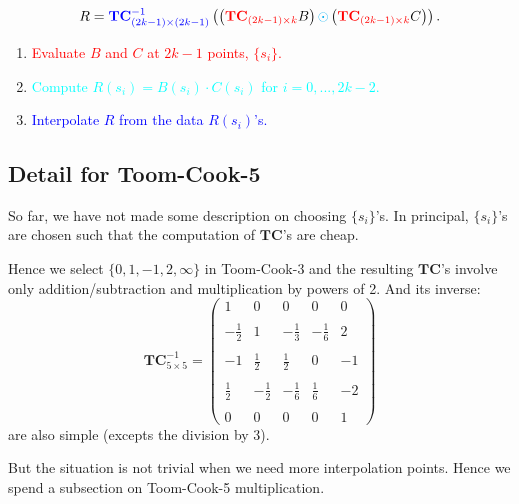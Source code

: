 \documentclass[
11pt,notheorems,hyperref={pdfauthor=whatever}
]{beamer}
\begin{document}
\begin{frame}
    \[
        R =\textcolor{blue}{\mathbf{TC}_{(2k-1) \times (2k-1)}^{-1}}
        \left(
            \left(
                \textcolor{red}{\mathbf{TC}_{(2k-1) \times k}} B
            \right) \textcolor{cyan}{\odot}\left(
                \textcolor{red}{\mathbf{TC}_{(2k-1) \times k}} C
            \right)
        \right) .
    \]
    \begin{enumerate}
        \item \textcolor{red}{Evaluate $B$ and $C$ at $2k-1$ points,  $\{ s_{i} \}$.}
        \item \textcolor{cyan}{Compute $R(s_{i}) = B(s_{i}) \cdot C(s_{i})$ for $i=0,...,2k-2$.}
        \item \textcolor{blue}{Interpolate $R$ from the data $R(s_{i})$'s.}
    \end{enumerate}
\end{frame}

\subsection{Detail for Toom-Cook-5}
\begin{frame}
So far, we have not made some description on choosing $\{s_{i}\}$'s. 
In principal, $\{s_{i}\}$'s are chosen such that the computation of $\mathbf{TC}$'s are cheap.

Hence we select $\{0,1,-1,2,\infty\}$ in Toom-Cook-3 and the resulting $\mathbf{TC}$'s involve only addition/subtraction and multiplication by powers of 2.
And its inverse:
\[
\mathbf{TC}_{5\times 5}^{-1}=
    \left(\begin{array}{rrrrr}
        1 & 0 & 0 & 0 & 0 \\ \\
        -\frac{1}{2} & 1 & -\frac{1}{3} & -\frac{1}{6} & 2 \\ \\
        -1 & \frac{1}{2} & \frac{1}{2} & 0 & -1 \\ \\
        \frac{1}{2} & -\frac{1}{2} & -\frac{1}{6} & \frac{1}{6} & -2 \\ \\
        0 & 0 & 0 & 0 & 1
    \end{array}\right)
\]
are also simple (excepts the division by 3).

But the situation is not trivial when we need more interpolation points.
Hence we spend a subsection on Toom-Cook-5 multiplication.
\end{frame}    
\end{document}
